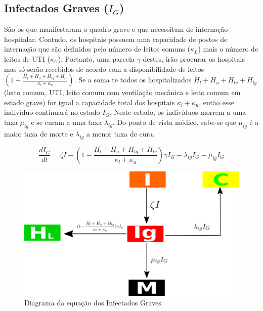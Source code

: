 \documentclass[12pt,letterpaper]{article}
\begin{document}
\subsection{Infectados Graves ($I_G$)}
São os que manifestaram o quadro grave e que necessitam de internação hospitalar. Contudo, os hospitais possuem uma capacidade de postos de internação que são definidos pelo número de leitos comuns ($\kappa_L$) mais o número de leitos de UTI ($\kappa_U$). Portanto, uma parcela $\gamma$ destes, irão procurar os hospitais mas só serão recebidos de acordo com a disponibilidade de leitos $(1-\frac{H_l+H_u+H_{lg}+H_{lv}}{\kappa_l+\kappa_u})$. Se a soma te todos os hospitalizados  $H_l+H_u+H_{lv}+H_{lg}$ (leito comum, UTI, leito comum com ventilação mecânica e leito comum em estado grave) for igual a capacidade total dos hospitais $\kappa_l+\kappa_u$, então esse indivíduo continuará no estado $I_G$. Neste estado, os indivíduos morrem a uma taxa $\mu_{ig}$ e se curam a uma taxa $\lambda_{ig}$. Do ponto de vista médico, sabe-se que $\mu_{ig}$ é a maior taxa de morte e $\lambda_{ig}$ a menor taxa de cura.

\begin{equation}
	\frac{dI_G}{dt}= \zeta I -(1-\frac{H_l+H_u+H_{lg}+H_{lv}}{\kappa_l+\kappa_u})\gamma I_G - \lambda_{ig} I_G - \mu_{ig} I_G
\end{equation}
\begin{figure}[!h]
	\centering
	\includegraphics[scale=0.4]{covidIg}
	\caption{Diagrama da equação dos Infectados Graves.}
	\label{fig:universe}
\end{figure}
\end{document}
